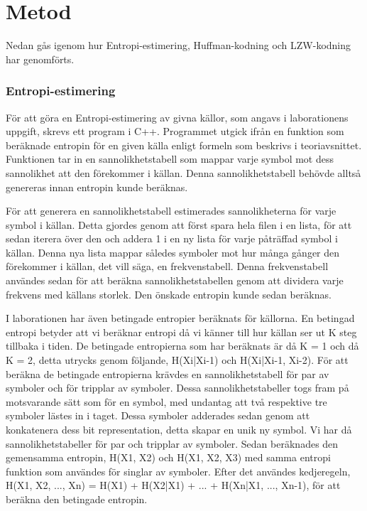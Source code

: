 
\chapter{Metod}
\label{cha:method}

Nedan gås igenom hur Entropi-estimering, Huffman-kodning och LZW-kodning har genomförts.

\subsection{Entropi-estimering}
För att göra en Entropi-estimering av givna källor, som angavs i laborationens uppgift, skrevs ett program i C++. Programmet utgick ifrån en funktion som beräknade entropin för en given källa enligt formeln som beskrivs i teoriavsnittet. Funktionen tar in en sannolikhetstabell som mappar varje symbol mot dess sannolikhet att den förekommer i källan. Denna sannolikhetstabell behövde alltså genereras innan entropin kunde beräknas.

För att generera en sannolikhetstabell estimerades sannolikheterna för varje symbol i källan. Detta gjordes genom att först spara hela filen i en lista, för att sedan iterera över den och addera 1 i en ny lista för varje påträffad symbol i källan. Denna nya lista mappar således symboler mot hur många gånger den förekommer i källan, det vill säga, en frekvenstabell. Denna frekvenstabell användes sedan för att beräkna sannolikhetstabellen genom att dividera varje frekvens med källans storlek. Den önskade entropin kunde sedan beräknas.

I laborationen har även betingade entropier beräknats för källorna. En betingad entropi betyder att vi beräknar entropi då vi känner till hur källan ser ut K steg tillbaka i tiden. De betingade entropierna som har beräknats är då K = 1 och då K = 2, detta utrycks genom följande, H(Xi|Xi-1) och H(Xi|Xi-1, Xi-2). För att beräkna de betingade entropierna krävdes en sannolikhetstabell för par av symboler och för tripplar av symboler. Dessa sannolikhetstabeller togs fram på motsvarande sätt som för en symbol, med undantag att två respektive tre symboler lästes in i taget. Dessa symboler adderades sedan genom att konkatenera dess bit representation, detta skapar en unik ny symbol. Vi har då sannolikhetstabeller för par och tripplar av symboler. Sedan beräknades den gemensamma entropin, H(X1, X2) och H(X1, X2, X3) med samma entropi funktion som användes för singlar av symboler. Efter det användes kedjeregeln, H(X1, X2, ..., Xn) = H(X1) + H(X2|X1) + ... + H(Xn|X1, ..., Xn-1), för att beräkna den betingade entropin.

